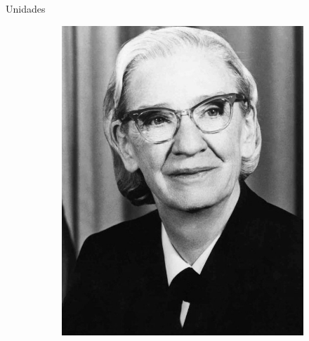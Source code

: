 \documentclass{beamer}
\begin{document}
\begin{frame}{Unidades}
\begin{figure}
\begin{subfigure}{0.24\textwidth}
        \includegraphics[width=\linewidth]{images/grace_hopper.jpg}
    \end{subfigure}
  \end{figure}
\end{frame}
\end{document}
